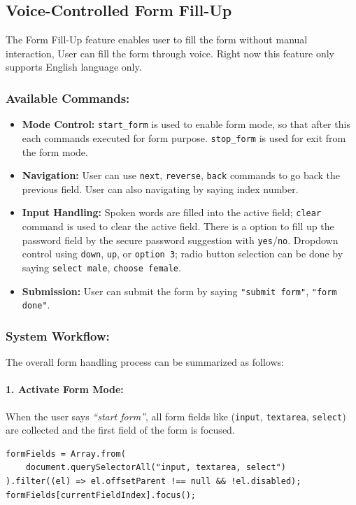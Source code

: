 \subsection{Voice-Controlled Form Fill-Up}
The Form Fill-Up feature enables user to fill the form without manual interaction, User can fill the form through voice. Right now this feature only supports English language only.

\subsubsection*{Available Commands:}

\begin{itemize}
    \item \textbf{Mode Control:} \texttt{start_form} is used to enable form mode, so that after this each commands executed for form purpose. \texttt{stop_form} is used for exit from the form mode.
    \item \textbf{Navigation:} User can use \texttt{next}, \texttt{reverse}, \texttt{back} commands to go back the previous field. User can also navigating by saying index number.
    \item \textbf{Input Handling:} Spoken words are filled into the active field; \texttt{clear} command is used to clear the active field. There is a option to fill up the password field by the secure password suggestion with \texttt{yes}/\texttt{no}. Dropdown control using \texttt{down}, \texttt{up}, or \texttt{option 3}; radio button selection can be done by saying \texttt{select male}, \texttt{choose female}.
    \item \textbf{Submission:} User can submit the form by saying \texttt{"submit form"}, \texttt{"form done"}.
\end{itemize}

\subsubsection*{System Workflow:}

The overall form handling process can be summarized as follows:
\paragraph{1. Activate Form Mode:}
When the user says \textit{``start form''}, all form fields like (\texttt{input}, \texttt{textarea}, \texttt{select}) are collected and the first field of the form is focused.

\begin{verbatim}
formFields = Array.from(
    document.querySelectorAll("input, textarea, select")
).filter((el) => el.offsetParent !== null && !el.disabled);
formFields[currentFieldIndex].focus();
\end{verbatim}

